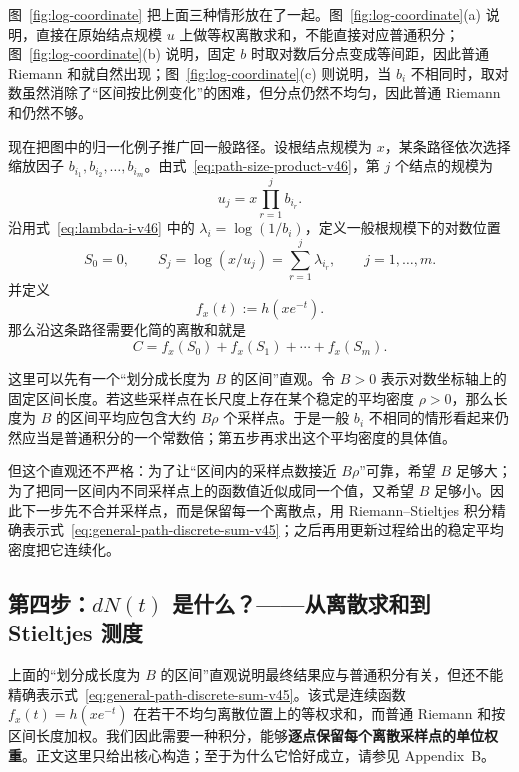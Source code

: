 \documentclass[11pt,a4paper]{article}
\begin{document}
图~\ref{fig:log-coordinate} 把上面三种情形放在了一起。图~\ref{fig:log-coordinate}(a) 说明，直接在原始结点规模 $u$ 上做等权离散求和，不能直接对应普通积分；图~\ref{fig:log-coordinate}(b) 说明，固定 $b$ 时取对数后分点变成等间距，因此普通 Riemann 和就自然出现；图~\ref{fig:log-coordinate}(c) 则说明，当 $b_i$ 不相同时，取对数虽然消除了“区间按比例变化”的困难，但分点仍然不均匀，因此普通 Riemann 和仍然不够。

现在把图中的归一化例子推广回一般路径。设根结点规模为 $x$，某条路径依次选择缩放因子 $b_{i_1},b_{i_2},\ldots,b_{i_m}$。由式~\eqref{eq:path-size-product-v46}，第 $j$ 个结点的规模为
\[
u_j=x\prod_{r=1}^{j}b_{i_r}.
\]
沿用式~\eqref{eq:lambda-i-v46} 中的 $\lambda_i=\log(1/b_i)$，定义一般根规模下的对数位置
\begin{equation}
S_0=0,\qquad
S_j=\log(x/u_j)
=\sum_{r=1}^{j}\lambda_{i_r},
\qquad j=1,\ldots,m.
\label{eq:general-log-samples-v45}
\end{equation}
并定义
\begin{equation}
f_x(t):=h(xe^{-t}).
\label{eq:fx-general-v45}
\end{equation}
那么沿这条路径需要化简的离散和就是
\begin{equation}
C=f_x(S_0)+f_x(S_1)+\cdots+f_x(S_m).
\label{eq:general-path-discrete-sum-v45}
\end{equation}

这里可以先有一个“划分成长度为 $B$ 的区间”直观。令 $B>0$ 表示对数坐标轴上的固定区间长度。若这些采样点在长尺度上存在某个稳定的平均密度 $\rho>0$，那么长度为 $B$ 的区间平均应包含大约 $B\rho$ 个采样点。于是一般 $b_i$ 不相同的情形看起来仍然应当是普通积分的一个常数倍；第五步再求出这个平均密度的具体值。

但这个直观还不严格：为了让“区间内的采样点数接近 $B\rho$”可靠，希望 $B$ 足够大；为了把同一区间内不同采样点上的函数值近似成同一个值，又希望 $B$ 足够小。因此下一步先不合并采样点，而是保留每一个离散点，用 Riemann--Stieltjes 积分精确表示式~\eqref{eq:general-path-discrete-sum-v45}；之后再用更新过程给出的稳定平均密度把它连续化。

\subsection{第四步：$dN(t)$ 是什么？——从离散求和到 Stieltjes 测度}
上面的“划分成长度为 $B$ 的区间”直观说明最终结果应与普通积分有关，但还不能精确表示式~\eqref{eq:general-path-discrete-sum-v45}。该式是连续函数 $f_x(t)=h(xe^{-t})$ 在若干不均匀离散位置上的等权求和，而普通 Riemann 和按区间长度加权。我们因此需要一种积分，能够\textbf{逐点保留每个离散采样点的单位权重}。正文这里只给出核心构造；至于为什么它恰好成立，请参见 Appendix~B。
\end{document}
